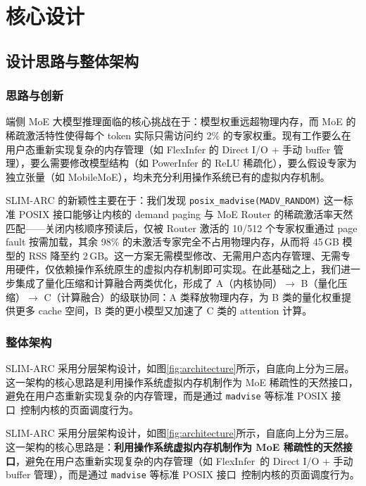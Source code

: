 \newpage
\section{核心设计}

\subsection{设计思路与整体架构}

\subsubsection{思路与创新}

端侧 MoE 大模型推理面临的核心挑战在于：模型权重远超物理内存，而 MoE 的稀疏激活特性使得每个 token 实际只需访问约 2\% 的专家权重。现有工作要么在用户态重新实现复杂的内存管理（如 FlexInfer 的 Direct I/O + 手动 buffer 管理），要么需要修改模型结构（如 PowerInfer 的 ReLU 稀疏化），要么假设专家为独立张量（如 MobileMoE），均未充分利用操作系统已有的虚拟内存机制。

SLIM-ARC 的新颖性主要在于：我们发现 \texttt{posix\_madvise(MADV\_RANDOM)} 这一标准 POSIX 接口能够让内核的 demand paging 与 MoE Router 的稀疏激活率天然匹配——关闭内核顺序预读后，仅被 Router 激活的 10/512 个专家权重通过 page fault 按需加载，其余 98\% 的未激活专家完全不占用物理内存，从而将 45\,GB 模型的 RSS 降至约 2\,GB。这一方案无需模型修改、无需用户态内存管理、无需专用硬件，仅依赖操作系统原生的虚拟内存机制即可实现。在此基础之上，我们进一步集成了量化压缩和计算融合两类优化，形成了 A（内核协同）$\to$ B（量化压缩）$\to$ C（计算融合）的级联协同：A 类释放物理内存，为 B 类的量化权重提供更多 cache 空间，B 类的更小模型又加速了 C 类的 attention 计算。

\subsubsection{整体架构}

SLIM-ARC 采用分层架构设计，如图\ref{fig:architecture}所示，自底向上分为三层。这一架构的核心思路是利用操作系统虚拟内存机制作为 MoE 稀疏性的天然接口，避免在用户态重新实现复杂的内存管理，而是通过 \texttt{madvise} 等标准 POSIX 接口~\cite{posix_madvise}控制内核的页面调度行为。

SLIM-ARC 采用分层架构设计，如图\ref{fig:architecture}所示，自底向上分为三层。这一架构的核心思路是：\textbf{利用操作系统虚拟内存机制作为 MoE 稀疏性的天然接口}，避免在用户态重新实现复杂的内存管理（如 FlexInfer~\cite{flexinfer2025}的 Direct I/O + 手动 buffer 管理），而是通过 \texttt{madvise} 等标准 POSIX 接口~\cite{posix_madvise}控制内核的页面调度行为。

